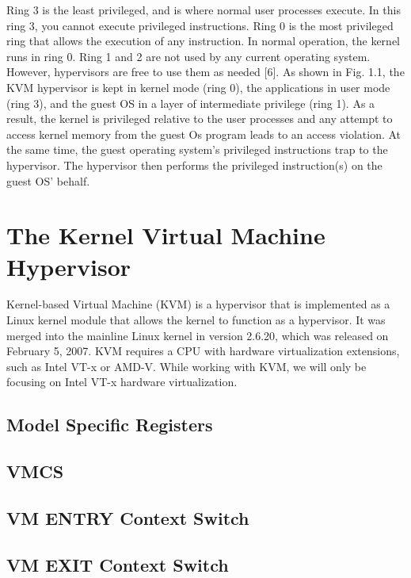 \documentclass{report}
\begin{document}
\begin{spacing}{1.5}
{\large
Ring 3 is the least privileged, and is where normal user processes execute. In this ring 3, you cannot execute privileged instructions. Ring 0 is the most privileged ring that allows the execution of any instruction. In normal operation, the kernel runs in ring 0. Ring 1 and 2 are not used by any current operating system. However, hypervisors are free to use them as needed [6]. As shown in Fig. 1.1, the KVM hypervisor is kept in kernel mode (ring 0), the applications in user mode (ring 3), and the guest OS in a layer of intermediate privilege (ring 1). As a result, the kernel is privileged relative to the user processes and any attempt to access kernel memory from the guest Os program leads to an access violation. At the same time, the guest operating system’s privileged instructions trap to the hypervisor. The hypervisor then performs the privileged instruction(s) on the guest OS' behalf.
\newline
}




\section{The Kernel Virtual Machine Hypervisor}


{\large 
Kernel-based Virtual Machine (KVM) is a hypervisor that is implemented as a Linux kernel module that allows the kernel to function as a hypervisor. It was merged into the mainline Linux kernel in version 2.6.20, which was released on February 5, 2007. KVM requires a CPU with hardware virtualization extensions, such as Intel VT-x or AMD-V. While working with KVM, we will only be focusing on Intel VT-x hardware virtualization.
\newline
}



\subsection{Model Specific Registers}
\subsection{VMCS}
\subsection{VM ENTRY Context Switch}
\subsection{VM EXIT Context Switch}

\end{spacing}
\end{document}
